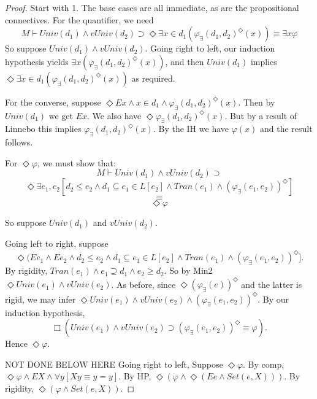 \documentclass{article}
\begin{document}
    \begin{proof}
        Start with 1.
        The base cases are all immediate, as are the propositional connectives. 
        For the quantifier, we need 
        $$M \vdash Univ(d_1) \wedge vUniv(d_2) \supset 
        \Diamond \exists x \in d_1(\varphi_\exists(d_1, d_2)^\Diamond(x)) 
        \equiv 
        \exists x \varphi$$
        So suppose $Univ(d_1) \wedge vUniv(d_2)$. 
        Going right to left, our induction hypothesis 
        yields $\exists x (\varphi_\exists(d_1, d_2)^\Diamond(x))$, 
        and then $Univ(d_1)$ 
        implies $\Diamond \exists x \in d_1 (\varphi_\exists(d_1, d_2)^\Diamond(x))$ as 
        required. 
    
        For the converse, suppose 
        $\Diamond Ex \wedge x \in d_1 \wedge \varphi_\exists(d_1, d_2)^\Diamond(x)$.
        Then by $Univ(d_1)$ we get $Ex$. 
        We also have $\Diamond \varphi_\exists(d_1, d_2)^\Diamond(x)$.
        But by a result of Linnebo this implies $\varphi_\exists(d_1, d_2)^\Diamond(x)$.
        By the IH we have $\varphi(x)$ and the result follows.
    
        For $\Diamond \varphi$, we must show that:
        $$M \vdash Univ(d_1) \wedge vUniv(d_2) \supset $$
        $$\Diamond \exists e_1, e_2[d_2 \leq e_2 \wedge d_1 \subseteq e_1 \in L[e_2] \wedge Tran(e_1) \wedge (\varphi_\exists(e_1, e_2))^\Diamond]$$
        $$\equiv $$
        $$\Diamond \varphi$$
    
        So suppose $Univ(d_1)$ and $vUniv(d_2)$. 
        
        Going left to right, suppose
        $$\Diamond (Ee_1 \wedge Ee_2  \wedge d_2 \leq e_2 \wedge d_1 \subseteq e_1 \in L[e_2] \wedge Tran(e_1) \wedge (\varphi_\exists(e_1, e_2))^\Diamond].$$
        By rigidity, $Tran(e_1) \wedge e_1 \supseteq d_1 \wedge e_2 \geq d_2$. 
        So by Min2 $\Diamond Univ(e_1) \wedge vUniv(e_2)$.
        As before, since
        $\Diamond (\varphi_\exists(e))^\Diamond$ and the latter is rigid, we may infer 
        $\Diamond Univ(e_1) \wedge vUniv(e_2) \wedge (\varphi_\exists(e_1, e_2))^\Diamond$.
        By our induction hypothesis, 
        $$\Box (Univ(e_1) \wedge vUniv(e_2) \supset (\varphi_\exists(e_1, e_2))^\Diamond \equiv \varphi).$$
        Hence $\Diamond \varphi$. 
        
        NOT DONE BELOW HERE
        Going right to left,
        Suppose $\Diamond \varphi$. By comp, 
        $\Diamond \varphi \wedge EX \wedge \forall y[Xy \equiv y = y]$.
        By HP, 
        $\Diamond (\varphi \wedge \Diamond (Ee \wedge Set(e, X)))$.
        By rigidity, $\Diamond (\varphi \wedge Set(e, X))$.
    

\end{proof}
\end{document}
